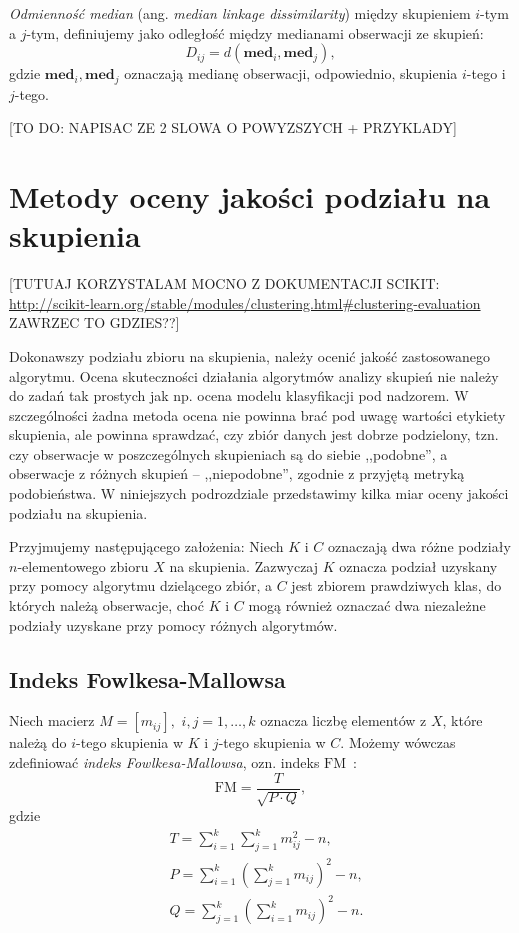 \documentclass{praca1}
\begin{document}
\begin{definition}
\emph{Odmienność median} (ang. \emph{median linkage dissimilarity}) między skupieniem $i$-tym a $j$-tym, definiujemy jako odległość między medianami obserwacji ze skupień:
$$
D_{ij} = d(\mathbf{med}_i, \mathbf{med}_j),
$$
gdzie $\mathbf{med}_i, \mathbf{med}_j$ oznaczają medianę obserwacji, odpowiednio, skupienia $i$-tego i $j$-tego.
\end{definition}

[TO DO: NAPISAC ZE 2 SLOWA O POWYZSZYCH + PRZYKLADY]

\section{Metody oceny jakości podziału na skupienia}

[TUTUAJ KORZYSTALAM MOCNO Z DOKUMENTACJI SCIKIT: \url{http://scikit-learn.org/stable/modules/clustering.html#clustering-evaluation}  ZAWRZEC TO GDZIES??]

Dokonawszy podziału zbioru na skupienia, należy ocenić jakość zastosowanego algorytmu. Ocena skuteczności działania algorytmów analizy skupień nie należy do zadań tak prostych jak np. ocena modelu klasyfikacji pod nadzorem. W szczególności żadna metoda ocena nie powinna brać pod uwagę wartości etykiety skupienia, ale powinna sprawdzać, czy zbiór danych jest dobrze podzielony, tzn. czy obserwacje w poszczególnych skupieniach są do siebie ,,podobne'', a obserwacje z różnych skupień -- ,,niepodobne'', zgodnie z przyjętą metryką podobieństwa. W niniejszych podrozdziale przedstawimy kilka miar oceny jakości podziału na skupienia.

Przyjmujemy następującego założenia: Niech $K$ i $C$ oznaczają dwa różne podziały $n$-elementowego zbioru $X$ na skupienia. Zazwyczaj $K$ oznacza podział uzyskany przy pomocy algorytmu dzielącego zbiór, a $C$ jest zbiorem prawdziwych klas, do których należą obserwacje, choć $K$ i $C$ mogą również oznaczać dwa niezależne podziały uzyskane przy pomocy różnych algorytmów.

\subsection{Indeks Fowlkesa-Mallowsa}

\begin{definition}
Niech macierz $M = [m_{ij}],$ $i,j = 1,\ldots, k$ oznacza liczbę elementów z $X$, które należą do $i$-tego skupienia w $K$ i $j$-tego skupienia w $C$. Możemy wówczas zdefiniować \emph{indeks Fowlkesa-Mallowsa}, ozn. indeks $\mathrm{FM}$~\cite{Fowlkes1983:fmindex}:
\begin{equation}
\mathrm{FM} = \frac{T}{\sqrt{P\cdot Q}},
\end{equation}
gdzie 
\begin{align*}
& T = \sum\limits_{i=1}^{k}\sum\limits_{j=1}^{k} m_{ij}^2 - n,\\
& P = \sum\limits_{i=1}^{k} (\sum\limits_{j=1}^{k} m_{ij})^2 - n,\\
& Q = \sum\limits_{j=1}^{k} (\sum\limits_{i=1}^{k} m_{ij})^2 - n.
\end{align*}
\end{definition}
\end{document}
